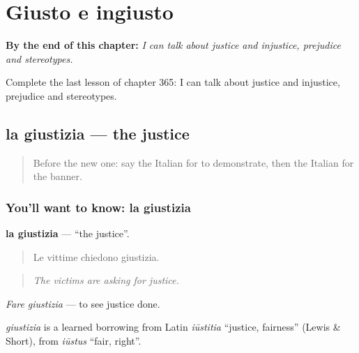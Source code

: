 
\chapter{Giusto e ingiusto}
\label{ch:it-giusto-e-ingiusto}

\begin{chapteropening}
\textbf{By the end of this chapter:} \emph{I can talk about justice and injustice, prejudice and stereotypes.}

Complete the last lesson of chapter 365: I can talk about justice and injustice, prejudice and stereotypes.
\end{chapteropening}

\section[la giustizia]{la giustizia — the justice}

\label{lesson:IT-C365-giustizia}



\begin{quote}
Before the new one: say the Italian for to demonstrate, then the Italian for the banner.
\end{quote}

\subsection*{You'll want to know: la giustizia}
\textbf{la giustizia} — \textquotedblleft{}the justice\textquotedblright{}.

\begin{quote}
Le vittime chiedono giustizia.
\end{quote}

\begin{quote}
\emph{The victims are asking for justice.}
\end{quote}

\emph{Fare giustizia} — to see justice done.

\begin{cousinweb}
\emph{giustizia} is a learned borrowing from Latin \emph{iūstitia} \textquotedblleft{}justice, fairness\textquotedblright{} (Lewis \& Short), from \emph{iūstus} \textquotedblleft{}fair, right\textquotedblright{}.
\end{cousinweb}

